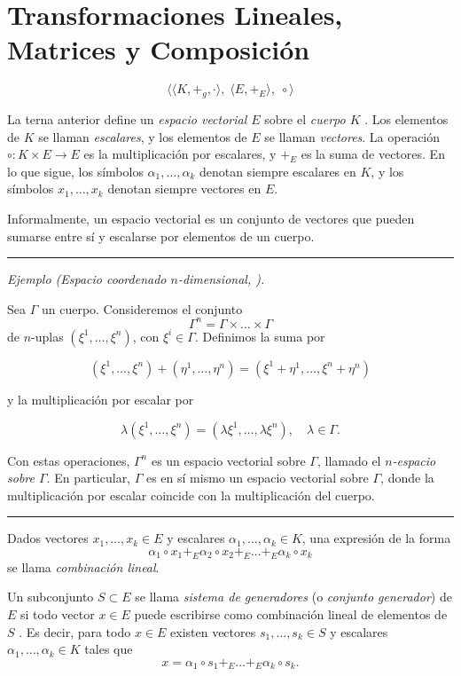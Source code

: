 \chapter{Transformaciones Lineales, Matrices y Composición}

\[
\Big\langle
\big\langle K, +_g, \cdot \big\rangle,\;
\big\langle E, +_E \big\rangle,\;
\circ
\Big\rangle
\]

La terna anterior define un \emph{espacio vectorial $E$} sobre el \emph{cuerpo $K$} \cite{cohen}. Los elementos de $K$ se llaman \emph{escalares}, y los elementos de $E$ se llaman \emph{vectores}. La operación
\(
\circ : K \times E \to E
\)
es la multiplicación por escalares, y $+_E$ es la suma de vectores. En lo que sigue, los símbolos $\alpha_1,\dots,\alpha_k$ denotan siempre escalares en $K$, y los símbolos $x_1,\dots,x_k$ denotan siempre vectores en $E$.

\medskip

Informalmente, un espacio vectorial es un conjunto de vectores que pueden sumarse entre sí y escalarse por elementos de un cuerpo.

\bigskip
\hrule
\medskip

\textit{Ejemplo (Espacio coordenado $n$-dimensional, \cite{greub}).}

Sea $\Gamma$ un cuerpo. Consideremos el conjunto
\[
\Gamma^n = \Gamma \times \dots \times \Gamma
\]
de $n$-uplas $(\xi^1,\dots,\xi^n)$, con $\xi^i \in \Gamma$. Definimos la suma por

\[
(\xi^1,\dots,\xi^n)+(\eta^1,\dots,\eta^n)=(\xi^1+\eta^1,\dots,\xi^n+\eta^n)
\]

y la multiplicación por escalar por

\[
\lambda(\xi^1,\dots,\xi^n)=(\lambda\xi^1,\dots,\lambda\xi^n),\quad \lambda \in \Gamma.
\]

Con estas operaciones, $\Gamma^n$ es un espacio vectorial sobre $\Gamma$, llamado el \emph{$n$-espacio sobre $\Gamma$}. En particular, $\Gamma$ es en sí mismo un espacio vectorial sobre $\Gamma$, donde la multiplicación por escalar coincide con la multiplicación del cuerpo.

\medskip
\hrule
\bigskip

Dados vectores $x_1,\dots,x_k \in E$ y escalares $\alpha_1,\dots,\alpha_k \in K$, una expresión de la forma
\[
\alpha_1 \circ x_1 +_E \alpha_2 \circ x_2 +_E \dots +_E \alpha_k \circ x_k
\]
se llama \emph{combinación lineal}.

\medskip

Un subconjunto $S \subset E$ se llama \emph{sistema de generadores} (o \emph{conjunto generador}) de $E$ si todo vector $x \in E$ puede escribirse como combinación lineal de elementos de $S$ \cite{greub}. Es decir, para todo $x \in E$ existen vectores $s_1,\dots,s_k \in S$ y escalares $\alpha_1,\dots,\alpha_k \in K$ tales que
\[
x = \alpha_1 \circ s_1 +_E \dots +_E \alpha_k \circ s_k.
\]

